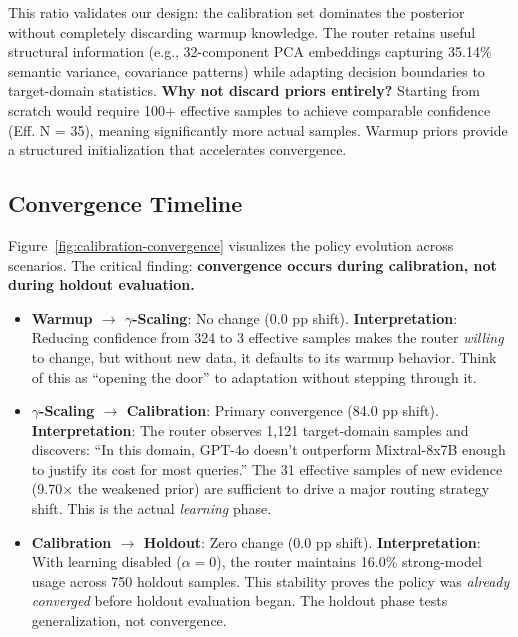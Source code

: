 This ratio validates our design: the calibration set dominates the posterior without completely discarding warmup knowledge. The router retains useful structural information (e.g., 32-component PCA embeddings capturing 35.14\% semantic variance, covariance patterns) while adapting decision boundaries to target-domain statistics. \textbf{Why not discard priors entirely?} Starting from scratch would require 100+ effective samples to achieve comparable confidence (Eff. N = 35), meaning significantly more actual samples. Warmup priors provide a structured initialization that accelerates convergence.

\subsection{Convergence Timeline}

Figure~\ref{fig:calibration-convergence} visualizes the policy evolution across scenarios. The critical finding: \textbf{convergence occurs during calibration, not during holdout evaluation.}

\begin{itemize}
    \item \textbf{Warmup $\rightarrow$ $\gamma$-Scaling}: No change (0.0 pp shift). \textbf{Interpretation}: Reducing confidence from 324 to 3 effective samples makes the router \emph{willing} to change, but without new data, it defaults to its warmup behavior. Think of this as ``opening the door'' to adaptation without stepping through it.
    
    \item \textbf{$\gamma$-Scaling $\rightarrow$ Calibration}: Primary convergence (84.0 pp shift). \textbf{Interpretation}: The router observes 1,121 target-domain samples and discovers: ``In this domain, GPT-4o doesn't outperform Mixtral-8x7B enough to justify its cost for most queries.'' The 31 effective samples of new evidence (9.70× the weakened prior) are sufficient to drive a major routing strategy shift. This is the actual \emph{learning} phase.
    
    \item \textbf{Calibration $\rightarrow$ Holdout}: Zero change (0.0 pp shift). \textbf{Interpretation}: With learning disabled ($\alpha=0$), the router maintains 16.0\% strong-model usage across 750 holdout samples. This stability proves the policy was \emph{already converged} before holdout evaluation began. The holdout phase tests generalization, not convergence.
\end{itemize}

